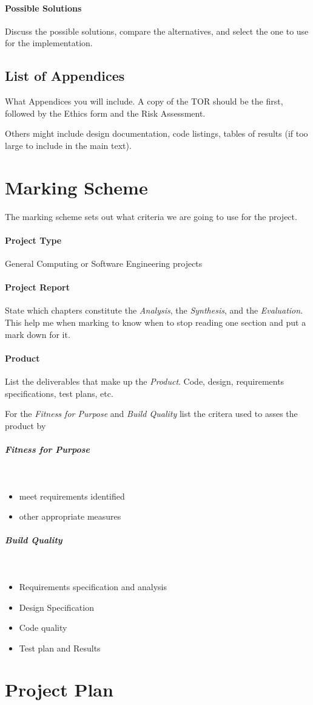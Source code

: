 \paragraph{Possible Solutions} Discuss the possible solutions, compare the
alternatives, and select the one to use for the  implementation.

\subsection{List of Appendices}
What Appendices you will include.  A copy of the TOR should be the first, followed by the Ethics form and the Risk Assessment.

Others might include design documentation, code listings, tables of results (if too large to include in the main text).

\section{Marking Scheme}
The marking scheme sets out what criteria we are going to use for the project.

\paragraph{Project Type} General Computing or Software Engineering projects

\paragraph{Project Report}  State which chapters constitute the \emph{Analysis}, the \emph{Synthesis}, and the \emph{Evaluation}.  This help me when marking to know when to stop reading one section and put a mark down for it.

\paragraph{Product}  List the deliverables that make up the \emph{Product}.  Code, design, requirements specifications, test plans, etc.

For the \emph{Fitness for Purpose} and \emph{Build Quality}  list the critera used to asses the product by

\subparagraph{Fitness for Purpose}~
\begin{itemize}
	\item meet requirements identified
	\item other appropriate measures
\end{itemize}

\subparagraph{Build Quality}~
\begin{itemize}
	\item Requirements specification and analysis
	\item Design Specification
	\item Code quality
	\item Test plan and Results
\end{itemize}

\clearpage

\section{Project Plan}
\noindent
{}
